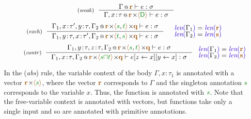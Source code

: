 \begin{figure}[t]
\begin{equation*}
\tyrule{weak}
  {\coctx{\Gamma}{ \aclrd{\textbf{r}} } \vdash e : \sigma}
  {\coctx{\Gamma,x \!:\! \tau}{\aclrd{\textbf{r}} \cons \alift{ \cclrd{\cclrd{\ident{D}}} }} \vdash e : \sigma}
\end{equation*}
\begin{equation*}
\tyrule{exch}
  {\coctx{\Gamma_1,x\!:\!\tau',y\!:\!\tau,\Gamma_2}{\aclrd{\textbf{r}} \cons\alift{\cclrd{s},\cclrd{t}} \cons \aclrd{\textbf{q}}} \vdash e : \sigma}
  {\coctx{\Gamma_1,y\!:\!\tau,x\!:\!\tau',\Gamma_2}{\aclrd{\textbf{r}} \cons\alift{\cclrd{t},\cclrd{s}} \cons \aclrd{\textbf{q}}} \vdash e : \sigma}
\quad
\begin{array}{l}
\slen{\Gamma_1} = \slen{\aclrd{\textbf{r}}}\\[-0.25em]
\slen{\Gamma_2} = \slen{\aclrd{\textbf{s}}}
\end{array}
\end{equation*}
\begin{equation*}
\tyrule{contr}
  {\coctx{\Gamma_1,y\!:\!\tau,z\!:\!\tau,\Gamma_2}{\aclrd{\textbf{r}} \cons \alift{\cclrd{s},\cclrd{t}} \cons \aclrd{\textbf{q}}} \vdash e : \sigma}
  {\coctx{\Gamma_1,x\!:\!\tau,\Gamma_2}{\aclrd{\textbf{r}} \cons \alift{\cclrd{s}\cclrd{\sqcap}\cclrd{t}} \cons \aclrd{\textbf{q}}} \vdash \subst{\subst{e}{z}{x}}{y}{x} : \sigma}
~
\begin{array}{l}
\slen{\Gamma_1} = \slen{\aclrd{\textbf{r}}}\\[-0.25em]
\slen{\Gamma_2} = \slen{\aclrd{\textbf{s}}}
\end{array}
\end{equation*}

\label{fig:applications-struct-live}
\vspace{-1em}
\end{figure}


In the (\emph{abs}) rule, the variable context of the body $\Gamma, x\!:\!\tau_1$ is annotated with
a vector $\mathbf{\aclrd{r}}\cons\alift{\cclrd{s}}$, where the vector $\mathbf{\aclrd{r}}$ corresponds
to $\Gamma$ and the singleton annotation $\cclrd{s}$ corresponds to the variable $x$. Thus, the
function is annotated with $\cclrd{s}$. Note that the free-variable context is annotated with vectors,
but functions take only a single input and so are annotated with primitive annotations.

